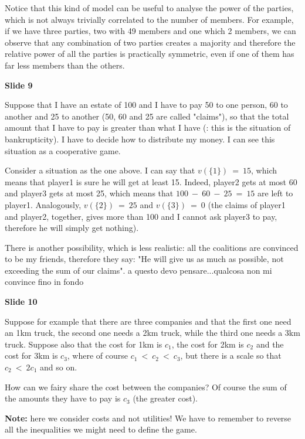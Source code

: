 \documentclass[pt11,a4paper,twoside,reqno,openright]{paper}
\begin{document}
\noindent Notice that this kind of model can be useful to analyse the power 
of the parties, which is not always trivially correlated to the number of 
members. For example, if we have three parties, two with 49 members and one 
which 2 members, we can observe that any combination of two parties creates 
a majority and therefore the relative power of all the parties is practically 
symmetric, even if one of them has far less members than the others.

\bigskip
\noindent \textbf{Slide 9}

\noindent Suppose that I have an estate of 100 and I have to pay 50 to one 
person, 60 to another and 25 to another (50, 60 and 25 are called "claims"), 
so that the total amount that I 
have to pay is greater than what I have (: this is the situation of 
bankrupticity). I have to decide how to distribute my money. I can see this 
situation as a cooperative game.

\noindent Consider a situation as the one above. I can say that $v(\{1\})~=~15$, 
which means that player1 is sure he will get at least 15. Indeed, player2 gets 
at most 60 and player3 gets at most 25, which means that $100~-~60~-~25~=~15$ 
are left to player1. Analogously, $v(\{2\})~=~25$ and $v(\{3\})~=~0$ (the claims 
of player1 and player2, together, gives more than 100 and I cannot ask player3 
to pay, therefore he will simply get nothing).

\noindent There is another possibility, which is less realistic: all the 
coalitions are convinced to be my friends, therefore they say: "He will give 
us as much as possible, not exceeding the sum of our claims". {\huge a questo 
devo pensare...qualcosa non mi convince fino in fondo}

\bigskip
\noindent \textbf{Slide 10}

\noindent Suppose for example that there are three companies and that the 
first one need an 1km truck, the second one needs a 2km truck, while the 
third one needs a 3km truck. Suppose also that the cost for 1km is $c_1$, 
the cost for 2km is $c_2$ and the cost for 3km is $c_3$, where of course 
$c_1~<~c_2~<~c_3$, but there is a scale so that $c_2~<~2c_1$ and so on.

\noindent How can we fairy share the cost between the companies? Of course 
the sum of the amounts they have to pay is $c_3$ (the greater cost).

\noindent \textbf{Note:} here we consider costs and not utilities! We have to 
remember to reverse all the inequalities we might need to define the game.
\end{document}
